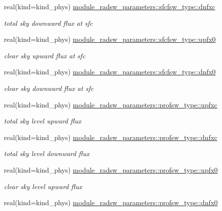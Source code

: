 \begin{DoxyCompactItemize}
real(kind=kind\+\_\+phys) \hyperlink{group__module__radsw__main_ga0e5e6bfe14ffd1a9c1c8abfc730db4ba}{module\+\_\+radsw\+\_\+parameters\+::sfcfsw\+\_\+type\+::dnfxc}
\begin{DoxyCompactList}\small\item\em total sky downward flux at sfc \end{DoxyCompactList}\item 
real(kind=kind\+\_\+phys) \hyperlink{group__module__radsw__main_ga6bfa85d5917ebc4ebc4ef079e3cf3eca}{module\+\_\+radsw\+\_\+parameters\+::sfcfsw\+\_\+type\+::upfx0}
\begin{DoxyCompactList}\small\item\em clear sky upward flux at sfc \end{DoxyCompactList}\item 
real(kind=kind\+\_\+phys) \hyperlink{group__module__radsw__main_ga2b1a4d8e0e93332fd08f3aa6b68fb141}{module\+\_\+radsw\+\_\+parameters\+::sfcfsw\+\_\+type\+::dnfx0}
\begin{DoxyCompactList}\small\item\em clear sky downward flux at sfc \end{DoxyCompactList}\item 
real(kind=kind\+\_\+phys) \hyperlink{group__module__radsw__main_ga5122ef2eef4e86a7aadf77114da4b3e2}{module\+\_\+radsw\+\_\+parameters\+::profsw\+\_\+type\+::upfxc}
\begin{DoxyCompactList}\small\item\em total sky level upward flux \end{DoxyCompactList}\item 
real(kind=kind\+\_\+phys) \hyperlink{group__module__radsw__main_ga4d253ac17ae97351a0a3eb15ab4d55e4}{module\+\_\+radsw\+\_\+parameters\+::profsw\+\_\+type\+::dnfxc}
\begin{DoxyCompactList}\small\item\em total sky level downward flux \end{DoxyCompactList}\item 
real(kind=kind\+\_\+phys) \hyperlink{group__module__radsw__main_gaa9205ed3a95d61dd8e4e7184fd6da43e}{module\+\_\+radsw\+\_\+parameters\+::profsw\+\_\+type\+::upfx0}
\begin{DoxyCompactList}\small\item\em clear sky level upward flux \end{DoxyCompactList}\item 
real(kind=kind\+\_\+phys) \hyperlink{group__module__radsw__main_gaff3ff3155ed05a18fa7caba351d1c503}{module\+\_\+radsw\+\_\+parameters\+::profsw\+\_\+type\+::dnfx0}

\end{DoxyCompactItemize}
